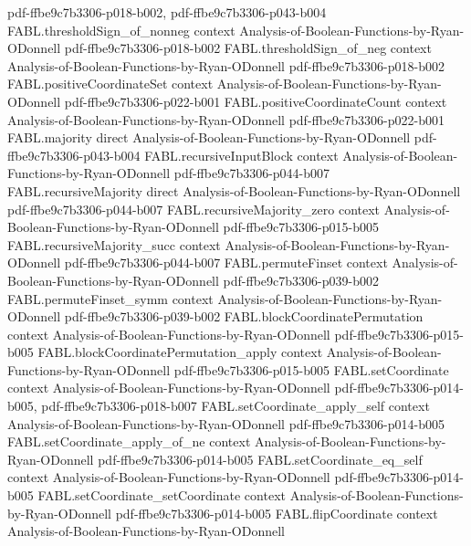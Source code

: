 \begin{theorem}
  {pdf-ffbe9c7b3306-p018-b002,
    pdf-ffbe9c7b3306-p043-b004}
\proofstep
  {FABL.thresholdSign_of_nonneg}
  {context}
  {Analysis-of-Boolean-Functions-by-Ryan-ODonnell}
  {pdf-ffbe9c7b3306-p018-b002}
\proofstep
  {FABL.thresholdSign_of_neg}
  {context}
  {Analysis-of-Boolean-Functions-by-Ryan-ODonnell}
  {pdf-ffbe9c7b3306-p018-b002}
\proofstep
  {FABL.positiveCoordinateSet}
  {context}
  {Analysis-of-Boolean-Functions-by-Ryan-ODonnell}
  {pdf-ffbe9c7b3306-p022-b001}
\proofstep
  {FABL.positiveCoordinateCount}
  {context}
  {Analysis-of-Boolean-Functions-by-Ryan-ODonnell}
  {pdf-ffbe9c7b3306-p022-b001}
\proofstep
  {FABL.majority}
  {direct}
  {Analysis-of-Boolean-Functions-by-Ryan-ODonnell}
  {pdf-ffbe9c7b3306-p043-b004}
\proofstep
  {FABL.recursiveInputBlock}
  {context}
  {Analysis-of-Boolean-Functions-by-Ryan-ODonnell}
  {pdf-ffbe9c7b3306-p044-b007}
\proofstep
  {FABL.recursiveMajority}
  {direct}
  {Analysis-of-Boolean-Functions-by-Ryan-ODonnell}
  {pdf-ffbe9c7b3306-p044-b007}
\proofstep
  {FABL.recursiveMajority_zero}
  {context}
  {Analysis-of-Boolean-Functions-by-Ryan-ODonnell}
  {pdf-ffbe9c7b3306-p015-b005}
\proofstep
  {FABL.recursiveMajority_succ}
  {context}
  {Analysis-of-Boolean-Functions-by-Ryan-ODonnell}
  {pdf-ffbe9c7b3306-p044-b007}
\proofstep
  {FABL.permuteFinset}
  {context}
  {Analysis-of-Boolean-Functions-by-Ryan-ODonnell}
  {pdf-ffbe9c7b3306-p039-b002}
\proofstep
  {FABL.permuteFinset_symm}
  {context}
  {Analysis-of-Boolean-Functions-by-Ryan-ODonnell}
  {pdf-ffbe9c7b3306-p039-b002}
\proofstep
  {FABL.blockCoordinatePermutation}
  {context}
  {Analysis-of-Boolean-Functions-by-Ryan-ODonnell}
  {pdf-ffbe9c7b3306-p015-b005}
\proofstep
  {FABL.blockCoordinatePermutation_apply}
  {context}
  {Analysis-of-Boolean-Functions-by-Ryan-ODonnell}
  {pdf-ffbe9c7b3306-p015-b005}
\proofstep
  {FABL.setCoordinate}
  {context}
  {Analysis-of-Boolean-Functions-by-Ryan-ODonnell}
  {pdf-ffbe9c7b3306-p014-b005,
    pdf-ffbe9c7b3306-p018-b007}
\proofstep
  {FABL.setCoordinate_apply_self}
  {context}
  {Analysis-of-Boolean-Functions-by-Ryan-ODonnell}
  {pdf-ffbe9c7b3306-p014-b005}
\proofstep
  {FABL.setCoordinate_apply_of_ne}
  {context}
  {Analysis-of-Boolean-Functions-by-Ryan-ODonnell}
  {pdf-ffbe9c7b3306-p014-b005}
\proofstep
  {FABL.setCoordinate_eq_self}
  {context}
  {Analysis-of-Boolean-Functions-by-Ryan-ODonnell}
  {pdf-ffbe9c7b3306-p014-b005}
\proofstep
  {FABL.setCoordinate_setCoordinate}
  {context}
  {Analysis-of-Boolean-Functions-by-Ryan-ODonnell}
  {pdf-ffbe9c7b3306-p014-b005}
\proofstep
  {FABL.flipCoordinate}
  {context}
  {Analysis-of-Boolean-Functions-by-Ryan-ODonnell}

\end{theorem}
